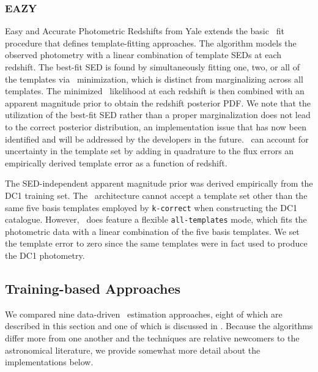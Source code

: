 \subsubsection{EAZY}

Easy and Accurate Photometric Redshifts from Yale \citep[\eazy\footnote{\url{https://github.com/gbrammer/eazy-photoz}},][]{Brammer:08} extends the basic \chisq\ fit procedure that defines template-fitting approaches.
The algorithm models the observed photometry with a linear combination of template SEDs at each redshift.
The best-fit SED is found by simultaneously fitting one, two, or all of the templates via \chisq\ minimization, which is distinct from marginalizing across all templates.
The minimized \chisq\ likelihood at each redshift is then combined with an apparent magnitude prior to obtain the redshift posterior PDF.
We note that the utilization of the best-fit SED rather than a proper marginalization does not lead to the correct posterior distribution, an implementation issue that has now been identified and will be addressed by the developers in the future.
\eazy\ can account for uncertainty in the template set by adding in quadrature to the flux errors an empirically derived template error as a function of redshift.

The SED-independent apparent magnitude prior was derived empirically from the DC1 training set.
The \eazy\ architecture cannot accept a template set other than the same five basis templates employed by \texttt{k-correct} when constructing the DC1 catalogue.
However, \eazy\ does feature a flexible \texttt{all-templates} mode, which fits the photometric data with a linear combination of the five basis templates.
We set the template error to zero since the same templates were in fact used to produce the DC1 photometry.

\subsection{Training-based Approaches}

We compared nine data-driven \pz\ estimation approaches, eight of which are described in this section and one of which is discussed in .
Because the algorithms differ more from one another and the techniques are relative newcomers to the astronomical literature, we provide somewhat more detail about the implementations below.


